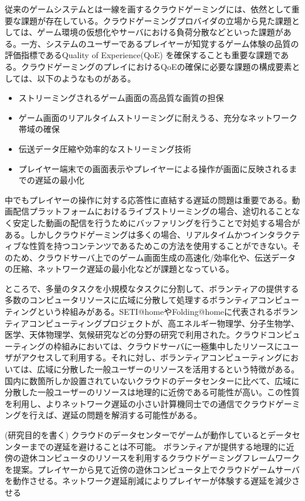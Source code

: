 従来のゲームシステムとは一線を画するクラウドゲーミングには、依然として重要な課題が存在している\cite{cloudgaming-survey}。クラウドゲーミングプロバイダの立場から見た課題としては、ゲーム環境の仮想化やサーバにおける負荷分散などといった課題がある。一方、システムのユーザーであるプレイヤーが知覚するゲーム体験の品質の評価指標であるQuality of Experience(QoE)
を確保することも重要な課題である。クラウドゲーミングのプレイにおけるQoEの確保に必要な課題の構成要素としては、以下のようなものがある。
\begin{itemize}
    \item ストリーミングされるゲーム画面の高品質な画質の担保
    \item ゲーム画面のリアルタイムストリーミングに耐えうる、充分なネットワーク帯域の確保
    \item 伝送データ圧縮や効率的なストリーミング技術
    \item プレイヤー端末での画面表示やプレイヤーによる操作が画面に反映されるまでの遅延の最小化
\end{itemize}
中でもプレイヤーの操作に対する応答性に直結する遅延の問題は重要である。動画配信プラットフォームにおけるライブストリーミングの場合、途切れることなく安定した動画の配信を行うためにバッファリングを行うことで対処する場合がある。しかしクラウドゲーミングは多くの場合、リアルタイムかつインタラクティブな性質を持つコンテンツであるためこの方法を使用することができない。そのため、クラウドサーバ上でのゲーム画面生成の高速化/効率化や、伝送データの圧縮、ネットワーク遅延の最小化などが課題となっている。

ところで、多量のタスクを小規模なタスクに分割して、ボランティアの提供する多数のコンピュータリソースに広域に分散して処理するボランティアコンピューティングという枠組みがある。SETI@home\cite{setiathome}やFolding@home\cite{folding}に代表されるボランティアコンピューティングプロジェクトが、高エネルギー物理学、分子生物学、医学、天体物理学、気候研究などの分野の研究で利用された。クラウドコンピューティングの枠組みにおいては、クラウドサーバに一極集中したリソースにユーザがアクセスして利用する。それに対し、ボランティアコンピューティングにおいては、広域に分散した一般ユーザーのリソースを活用するという特徴がある。国内に数箇所しか設置されていないクラウドのデータセンターに比べて、広域に分散した一般ユーザーのリソースは地理的に近傍である可能性が高い。この性質を利用し、よりネットワーク遅延の小さい計算機同士での通信でクラウドゲーミングを行えば、遅延の問題を解消する可能性がある。


(研究目的を書く)
クラウドのデータセンターでゲームが動作しているとデータセンターまでの遅延を避けることは不可能。
ボランティアが提供する地理的に近傍の遊休コンピュータのリソースを利用するクラウドゲーミングフレームワークを提案。プレイヤーから見て近傍の遊休コンピュータ上でクラウドゲームサーバを動作させる。ネットワーク遅延削減によりプレイヤーが体験する遅延を減少させる





 
